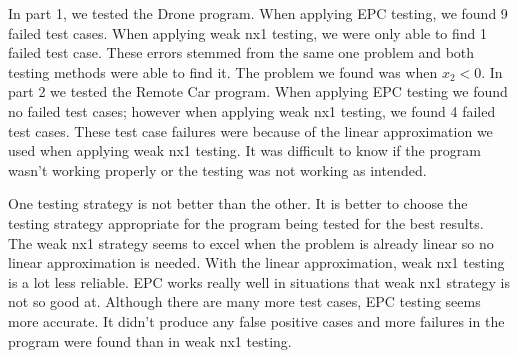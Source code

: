 \documentclass[12pt, letterpaper, titlepage]{article}
\begin{document}
In part 1, we tested the Drone program. When applying EPC testing, we found 9 failed test cases. When applying weak nx1 testing, we were only able to find 1 failed test case. These errors stemmed from the same one problem and both testing methods were able to find it. The problem we found was when $x_2 < 0$. In part 2 we tested the Remote Car program. When applying EPC testing we found no failed test cases; however when applying weak nx1 testing, we found 4 failed test cases. These test case failures were because of the linear approximation we used when applying weak nx1 testing. It was difficult to know if the program wasn't working properly or the testing was not working as intended. 

One testing strategy is not better than the other. It is better to choose the testing strategy appropriate for the program being tested for the best results. The weak nx1 strategy seems to excel when the problem is already linear so no linear approximation is needed. With the linear approximation, weak nx1 testing is a lot less reliable. EPC works really well in situations that weak nx1 strategy is not so good at. Although there are many more test cases, EPC testing seems more accurate. It didn't produce any false positive cases and more failures in the program were found than in weak nx1 testing. 
\end{document}
